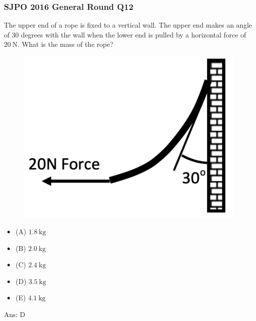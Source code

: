 \documentclass{article}
\begin{document}
\subsubsection{SJPO 2016 General Round Q12}
The upper end of a rope is fixed to a vertical wall. The upper end makes an angle of 30 degrees with the wall when the lower end is pulled by a horizontal force of $20 \mathrm{~N}$. What is the mass of the rope?
{
\begin{figure}
\includegraphics[width=1.0\linewidth]{images/sjpo2016q12.png}
\end{figure}
\begin{itemize}
\item[] (A) $1.8 \mathrm{~kg}$
\item[] (B) $2.0 \mathrm{~kg}$
\item[] (C) $2.4 \mathrm{~kg}$
\item[] (D) $3.5 \mathrm{~kg}$
\item[] (E) $4.1 \mathrm{~kg}$
\end{itemize}
}
Ans: \ifpaper D \fi
\end{document}
